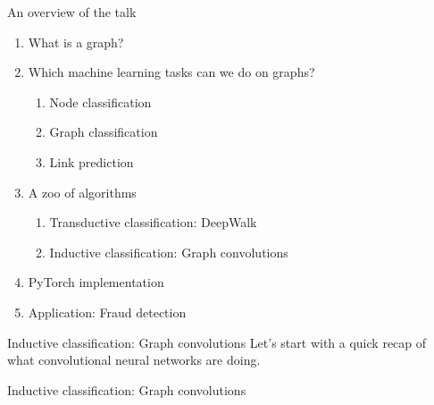 \documentclass{beamer}
\begin{document}

\begin{frame}{An overview of the talk}
  \begin{enumerate}
    \item What is a graph?
    \item Which machine learning tasks can we do on graphs?
      \begin{enumerate}
        \item Node classification
        \item Graph classification
        \item Link prediction
      \end{enumerate}
    \item A zoo of algorithms
      \begin{enumerate}
        \item Transductive classification: DeepWalk
        \item<alert@1> Inductive classification: Graph convolutions
      \end{enumerate}
    \item PyTorch implementation
    \item Application: Fraud detection
  \end{enumerate}
\end{frame}

\begin{frame}{Inductive classification: Graph convolutions}
  Let's start with a quick recap of what convolutional neural networks 
  are doing.
\end{frame}

\begin{frame}{Inductive classification: Graph convolutions}
  \begin{center}
  \end{center}
\end{frame}
\end{document}

